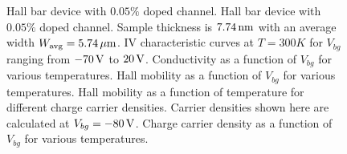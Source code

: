 \begin{figure}[ht]
	\caption[Hall measurement data for $0.05\%$  doped  channel]{\protect{} Hall bar device with $0.05\%$  doped  channel. Hall bar device with $0.05\%$  doped  channel. Sample thickness is $7.74\,\mathrm{nm}$ with an average width $W_\mathrm{avg}=5.74\,\mathrm{\mu m}$. \protect{} IV characteristic curves at $T=300K$ for $V_{bg}$ ranging from $-70\,\mathrm{V}$ to $20\,\mathrm{V}$. \protect{} Conductivity as a function of $V_{bg}$ for various temperatures. \protect{} Hall mobility as a function of $V_{bg}$ for various temperatures. \protect{} Hall mobility as a function of temperature for different charge carrier densities. Carrier densities shown here are calculated at $V_{bg}=-80\,\mathrm{V}$. \protect{} Charge carrier density as a function of $V_{bg}$ for various temperatures.}
	\label{fig:hall_measurement_data1}
\end{figure}

